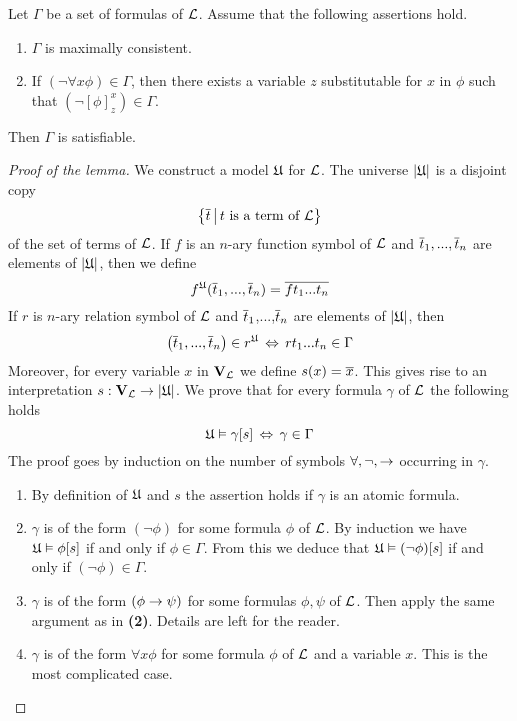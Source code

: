 \begin{lemma}\label{lemma:model_existence_lemma}
Let $\Gamma$ be a set of formulas of ${\mathcal L}$. Assume that the following assertions hold.
\begin{enumerate}[label=\emph{\textbf{(\arabic*)}}, leftmargin=3.0em]
\item $\Gamma$ is maximally consistent.
\item If $(\neg\forall x\phi) \in \Gamma$, then there exists a variable $z$ substitutable for $x$ in $\phi$ such that $(\neg[\phi]^x_z) \in \Gamma$.
\end{enumerate}
Then $\Gamma$ is satisfiable.
\end{lemma}
\begin{proof}[Proof of the lemma]
We construct a model ${\mathfrak U}$ for ${\mathcal L}$. The universe $|{\mathfrak U}|$ is a disjoint copy
$$\big\{\overline{t}\,\big|\,t\mbox{ is a term of }{\mathcal L}\big\}$$
of the set of terms of ${\mathcal L}$. If $f$ is an $n$-ary function symbol of ${\mathcal L}$ and $\overline{t}_1,...,\overline{t}_n$ are elements of $|{\mathfrak U}|$, then we define
$$f^{{\mathfrak U}}(\overline{t}_1,...,\overline{t}_n) = \overline{ft_1...t_n}$$
If $r$ is $n$-ary relation symbol of ${\mathcal L}$ and $\overline{t}_1$,...,$\overline{t}_n$ are elements of $|{\mathfrak U}|$, then
$$\left(\overline{t}_1,...,\overline{t}_n\right)\in r^{{\mathfrak U}}\,\Leftrightarrow\,rt_1...t_n \in \Gamma$$
Moreover, for every variable $x$ in $\mathbf{V}_{{\mathcal L}}$ we define $s(x) = \overline{x}$. This gives rise to an interpretation $s:\mathbf{V}_{{\mathcal L}}\rightarrow |{\mathfrak U}|$. We prove that for every formula $\gamma$ of ${\mathcal L}$ the following holds
$${\mathfrak U} \vDash \gamma[s] \,\Leftrightarrow\, \gamma \in \Gamma$$
The proof goes by induction on the number of symbols $\forall , \neg, \rightarrow$ occurring in $\gamma$.
\begin{enumerate}[label=\textbf{(\arabic*)}, leftmargin=3.0em]
\item By definition of ${\mathfrak U}$ and $s$ the assertion holds if $\gamma$ is an atomic formula.
\item $\gamma$ is of the form $(\neg\phi)$ for some formula $\phi$ of ${\mathcal L}$. By induction we have ${\mathfrak U} \vDash \phi[s]$ if and only if $\phi \in \Gamma$. From this we deduce that ${\mathfrak U} \vDash (\neg\phi)[s]$ if and only if $(\neg\phi) \in \Gamma$.
\item $\gamma$ is of the form $(\phi \rightarrow \psi)$ for some formulas $\phi, \psi$ of ${\mathcal L}$. Then apply the same argument as in \textbf{(2)}. Details are left for the reader.
\item $\gamma$ is of the form $\forall x\phi$ for some formula $\phi$ of ${\mathcal L}$ and a variable $x$. This is the most complicated
case.
\begin{itemize}

\end{itemize}
\end{enumerate}
\end{proof}
